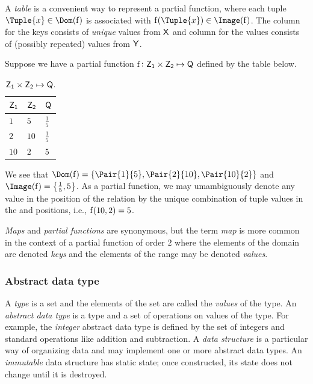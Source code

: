 \documentclass[11pt,final,hidelinks]{article}
\begin{document}
A \emph{table} is a convenient way to represent a partial function, where each tuple $\Tuple{x} \in \Dom(\PFun{f})$ is associated with $\PFun{f}(\Tuple{x}) \in \Image(\PFun{f})$. The column for the keys consists of \emph{unique} values from $\Set{X}$ and column for the values consists of (possibly repeated) values from $\Set{Y}$.
\begin{example}
	Suppose we have a partial function $\PFun{f} \colon \Set{Z}[1] \times \Set{Z}[2] \mapsto \Set{Q}$ defined by the table below.
	\begin{table}[h]
		\centering
		\label{tbl:partialfunc}
		\begin{tabular}{l l l} 
			\toprule
			$\Set{Z}[1]$ & $\Set{Z}[2]$ & $\Set{Q}$\\
			\midrule
			$1$ & $5$ & $\frac{1}{5}$\\
			$2$ & $10$ & $\frac{1}{5}$\\
			$10$ & $2$ & $5$\\
			\bottomrule
		\end{tabular}
		\caption*{$\Set{Z}[1] \times \Set{Z}[2] \mapsto \Set{Q}$.}
	\end{table}
	We see that $\Dom(\PFun{f}) = \{\Pair{1}{5},\Pair{2}{10},\Pair{10}{2}\}$ and $\Image(\PFun{f}) = \left\{\frac{1}{5},5\right\}$. As a partial function, we may umambiguously denote any value in the  position of the relation by the unique combination of tuple values in the  and  positions, i.e., $\PFun{f}(10,2)=5$.
\end{example}

\emph{Maps} and \emph{partial functions} are synonymous, but the term \emph{map} is more common in the context of a partial function of order $2$ where the elements of the domain are denoted \emph{keys} and the elements of the range may be denoted \emph{values}.








\subsubsection{Abstract data type}
A \emph{type} is a set and the elements of the set are called the \emph{values} of the type. An \emph{abstract data type} is a type and a set of operations on values of the type. For example, the \emph{integer} abstract data type is defined by the set of integers and standard operations like addition and subtraction. A \emph{data structure} is a particular way of organizing data and may implement one or more abstract data types. An \emph{immutable} data structure has static state; once constructed, its state does not change until it is destroyed.
\end{document}
